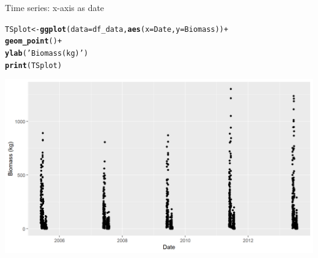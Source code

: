 \documentclass{beamer}\usepackage[]{graphicx}\usepackage[]{color}
\makeatletter
\newcommand{\hlstr}[1]{\textcolor[rgb]{0.192,0.494,0.8}{#1}}%
\newcommand{\hlopt}[1]{\textcolor[rgb]{0,0,0}{#1}}%
\newcommand{\hlstd}[1]{\textcolor[rgb]{0.345,0.345,0.345}{#1}}%
\newcommand{\hlkwb}[1]{\textcolor[rgb]{0.69,0.353,0.396}{#1}}%
\newcommand{\hlkwc}[1]{\textcolor[rgb]{0.333,0.667,0.333}{#1}}%
\newcommand{\hlkwd}[1]{\textcolor[rgb]{0.737,0.353,0.396}{\textbf{#1}}}%
\newenvironment{kframe}{%
 \def\at@end@of@kframe{}%
 \ifinner\ifhmode%
  \def\at@end@of@kframe{\end{minipage}}%
  \begin{minipage}{\columnwidth}%
 \fi\fi%
 \def\FrameCommand##1{\hskip\@totalleftmargin \hskip-\fboxsep
 \colorbox{shadecolor}{##1}\hskip-\fboxsep
     \hskip-\linewidth \hskip-\@totalleftmargin \hskip\columnwidth}%
 \MakeFramed {\advance\hsize-\width
   \@totalleftmargin\z@ \linewidth\hsize
   \@setminipage}}%
 {\par\unskip\endMakeFramed%
 \at@end@of@kframe}
\newenvironment{knitrout}{}{} %
\makeatother
\begin{document}
\begin{frame}[fragile]{Time series: x-axis as date}
\begin{knitrout}\footnotesize
{}\color{fgcolor}\begin{kframe}
\begin{alltt}
\hlstd{TSplot} \hlkwb{<-} \hlkwd{ggplot}\hlstd{(}\hlkwc{data}\hlstd{=df_data,} \hlkwd{aes}\hlstd{(}\hlkwc{x}\hlstd{=Date,} \hlkwc{y}\hlstd{=Biomass))} \hlopt{+}
  \hlkwd{geom_point}\hlstd{()} \hlopt{+}
  \hlkwd{ylab}\hlstd{(}\hlstr{'Biomass (kg)'}\hlstd{)}
\hlkwd{print}\hlstd{(TSplot)}
\end{alltt}
\end{kframe}

{\centering \includegraphics[width=.9\linewidth]{figure/TSplot_i95d1-1} 

}



\end{knitrout}
\end{frame}
\end{document}
